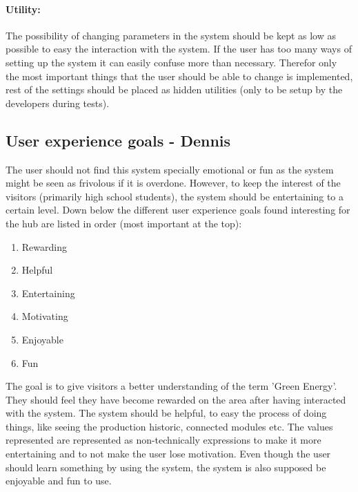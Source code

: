 \paragraph{Utility:}
The possibility of changing parameters in the system should be kept as low as possible to easy the interaction with the system. If the user has too many ways of setting up the system it can easily confuse more than necessary. Therefor only the most important things that the user should be able to change is implemented, rest of the settings should be placed as hidden utilities (only to be setup by the developers during tests). 
\subsection{User experience goals - Dennis}
The user should not find this system specially emotional or fun as the system might be seen as frivolous if it is overdone. However, to keep the interest of the visitors (primarily high school students), the system should be entertaining to a certain level.  
Down below the different user experience goals found interesting for the hub are listed in order (most important at the top):
\begin{enumerate}
	\item Rewarding
	\item Helpful
	\item Entertaining
	\item Motivating
	\item Enjoyable
	\item Fun
\end{enumerate}


The goal is to give visitors a better understanding of the term 'Green Energy'. They should feel they have become rewarded on the area after having interacted with the system. The system should be helpful, to easy the process of doing things, like seeing the production historic, connected modules etc. The values represented are represented as non-technically expressions to make it more entertaining and to not make the user lose motivation. Even though the user should learn something by using the system, the system is also supposed be enjoyable and fun to use.
